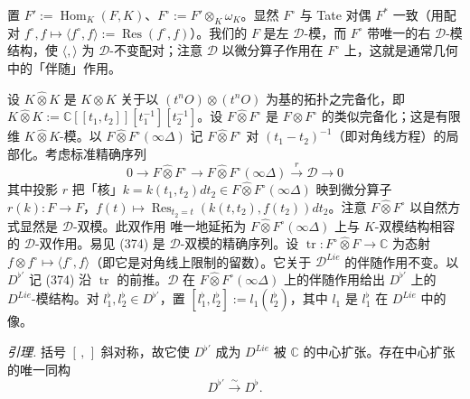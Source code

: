 置 $F':=\operatorname{Hom}_{K}(F,K)$、$F^{\circ}:=F'\otimes_{K}\omega_{K}$。显然 $F^{\circ}$ 与 Tate 对偶 $F^{*}$ 一致（用配对 $f^{\circ},f\mapsto\langle f^{\circ},f\rangle:=\operatorname{Res}(f^{\circ},f)$）。我们的 $F$ 是左 $\mathcal{D}$-模，而 $F^{\circ}$ 带唯一的右 $\mathcal{D}$-模结构，使 $\langle,\rangle$ 为 $\mathcal{D}$-不变配对；注意 $\mathcal{D}$ 以微分算子作用在 $F^{\circ}$ 上，这就是通常几何中的「伴随」作用。

设 $K\widehat{\otimes}K$ 是 $K\otimes K$ 关于以 $(t^{n}O)\otimes(t^{n}O)$ 为基的拓扑之完备化，即 $K\widehat{\otimes}K:=\mathbb{C}[[t_{1},t_{2}]][t_{1}^{-1}][t_{2}^{-1}]$。设 $F\widehat{\otimes}F^{\circ}$ 是 $F\otimes F^{\circ}$ 的类似完备化；这是有限维 $K\widehat{\otimes}K$-模。以 $F\widehat{\otimes}F^{\circ}(\infty\Delta)$ 记 $F\widehat{\otimes}F^{\circ}$ 对 $(t_{1}-t_{2})^{-1}$（即对角线方程）的局部化。考虑标准精确序列
\begin{equation}\tag{374}
0\to F\widehat{\otimes}F^{\circ}\to F\widehat{\otimes}F^{\circ}(\infty\Delta)\xrightarrow{r}\mathcal{D}\to 0
\end{equation}
其中投影 $r$ 把「核」$k=k(t_{1},t_{2})dt_{2}\in F\widehat{\otimes}F^{\circ}(\infty\Delta)$ 映到微分算子 $r(k):F\to F$，$f(t)\mapsto\operatorname{Res}_{t_{2}=t}(k(t,t_{2}),f(t_{2}))dt_{2}$。注意 $F\widehat{\otimes}F^{\circ}$ 以自然方式显然是 $\mathcal{D}$-双模。此双作用%
唯一地延拓为 $F\widehat{\otimes}F^{\circ}(\infty\Delta)$ 上与 $K$-双模结构相容的 $\mathcal{D}$-双作用。易见 (374) 是 $\mathcal{D}$-双模的精确序列。设 $\operatorname{tr}:F^{\circ}\widehat{\otimes}F\to\mathbb{C}$ 为态射 $f\otimes f^{\circ}\mapsto\langle f^{\circ},f\rangle$（即它是对角线上限制的留数）。它关于 $\mathcal{D}^{Lie}$ 的伴随作用不变。以 $D^{\flat'}$ 记 (374) 沿 $\operatorname{tr}$ 的前推。$\mathcal{D}$ 在 $F\widehat{\otimes}F^{\circ}(\infty\Delta)$ 上的伴随作用给出 $D^{\flat'}$ 上的 $D^{Lie}$-模结构。对 $l^{\flat}_{1},l^{\flat}_{2}\in D^{\flat'}$，置 $[l^{\flat}_{1},l^{\flat}_{2}]:=l_{1}(l^{\flat}_{2})$，其中 $l_{1}$ 是 $l^{\flat}_{1}$ 在 $D^{Lie}$ 中的像。

 \emph{引理.} 括号 $[\,,\,]$ 斜对称，故它使 $D^{\flat'}$ 成为 $D^{Lie}$ 被 $\mathbb{C}$ 的中心扩张。存在中心扩张的唯一同构
\[
D^{\flat'}\xrightarrow{\sim}D^{\flat}.
\]

